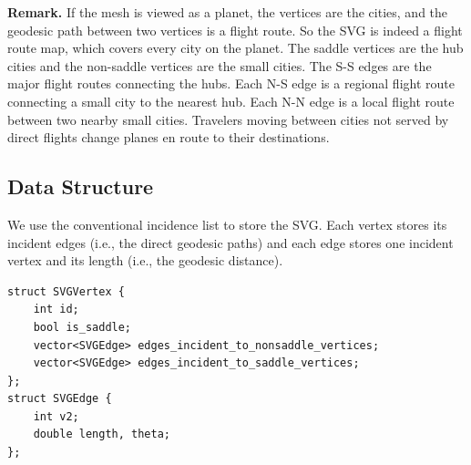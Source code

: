 \noindent\textbf{Remark.} If the mesh is viewed as a planet, the
vertices are the cities, and the geodesic path between two vertices
is a flight route. So the SVG is indeed a flight route map, which
covers every city on the planet. The saddle vertices are the hub
cities and the non-saddle vertices are the small cities. The S-S
edges are the major flight routes connecting the hubs. Each N-S edge
is a regional flight route connecting a small city to the nearest
hub. Each N-N edge is a local flight route between two nearby small
cities. Travelers moving between cities not served by direct flights
change planes en route to their destinations.


\subsection{Data Structure}
\label{subsec:datastructure}

We use the conventional incidence list to store the SVG. Each vertex
stores its incident edges (i.e., the direct geodesic paths) and each
edge stores one incident vertex and its length (i.e., the geodesic
distance).

\begin{small}
\begin{verbatim}
struct SVGVertex {
    int id;
    bool is_saddle;
    vector<SVGEdge> edges_incident_to_nonsaddle_vertices;
    vector<SVGEdge> edges_incident_to_saddle_vertices;
};
struct SVGEdge {
    int v2;
    double length, theta;
};
\end{verbatim}
\end{small}

